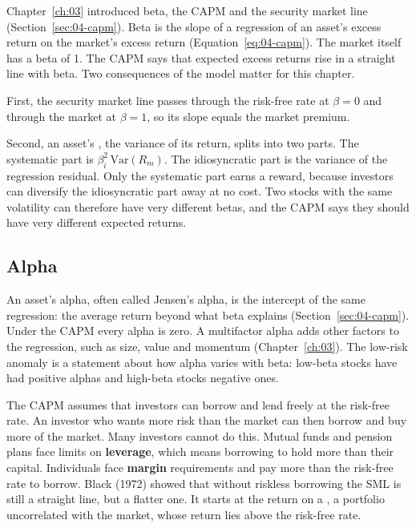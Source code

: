Chapter~\ref{ch:03} introduced beta, the CAPM and the security market line (Section~\ref{sec:04-capm}). Beta is the slope of a regression of an asset's excess return on the market's excess return (Equation~\eqref{eq:04-capm}). The market itself has a beta of 1. The CAPM says that expected excess returns rise in a straight line with beta. Two consequences of the model matter for this chapter.

First, the security market line passes through the risk-free rate at $\beta = 0$ and through the market at $\beta = 1$, so its slope equals the market premium.

Second, an asset's , the variance of its return, splits into two parts. The systematic part is $\beta_i^2\,\mathrm{Var}(R_m)$. The idiosyncratic part is the variance of the regression residual. Only the systematic part earns a reward, because investors can diversify the idiosyncratic part away at no cost. Two stocks with the same volatility can therefore have very different betas, and the CAPM says they should have very different expected returns.

\subsection{Alpha}

An asset's alpha, often called Jensen's alpha, is the intercept of the same regression: the average return beyond what beta explains (Section~\ref{sec:04-capm}). Under the CAPM every alpha is zero. A multifactor alpha adds other factors to the regression, such as size, value and momentum (Chapter~\ref{ch:03}). The low-risk anomaly is a statement about how alpha varies with beta: low-beta stocks have had positive alphas and high-beta stocks negative ones.

The CAPM assumes that investors can borrow and lend freely at the risk-free rate. An investor who wants more risk than the market can then borrow and buy more of the market. Many investors cannot do this. Mutual funds and pension plans face limits on \textbf{leverage}, which means borrowing to hold more than their capital. Individuals face \textbf{margin} requirements and pay more than the risk-free rate to borrow. Black (1972) showed that without riskless borrowing the SML is still a straight line, but a flatter one. It starts at the return on a , a portfolio uncorrelated with the market, whose return lies above the risk-free rate.

